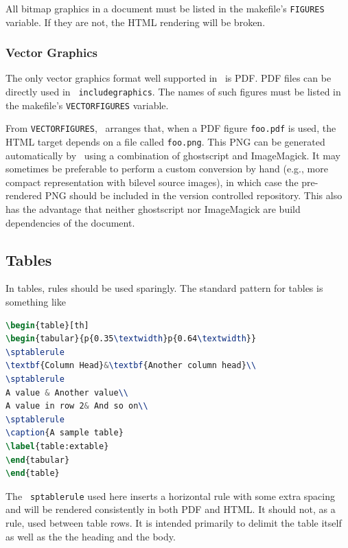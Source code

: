 \documentclass[11pt,a4paper]{ivoa}
\newcommand{\texword}[1]{\texttt{\color{texcolor} #1}}
\begin{document}
All bitmap graphics in a document must  be listed in the makefile's
\texttt{FIGURES} variable.  If they are not, the HTML rendering will be
broken.

\subsubsection{Vector Graphics}
\label{sect:vectorgraphics}

The only vector graphics format well supported in \ivoatex\ is PDF.  PDF
files can be directly used in \texword{includegraphics}.  The names of
such figures must be listed in the makefile's \texttt{VECTORFIGURES}
variable.

From \texttt{VECTORFIGURES}, \ivoatex\ arranges that, when a PDF figure 
\texttt{foo.pdf} is used, the HTML target depends on a file called
\texttt{foo.png}.  This PNG can be generated automatically by
\ivoatex\ using a combination of ghostscript and ImageMagick.  It may
sometimes be preferable to perform a custom conversion by hand (e.g.,
more compact representation with bilevel source images), in which case
the pre-rendered PNG should be included in the version controlled
repository.  This also
has the advantage that neither ghostscript nor ImageMagick are build
dependencies of the document.

\subsection{Tables}

In tables, rules should be used sparingly.  The standard pattern for tables is
something like
\begin{lstlisting}[language=tex]
\begin{table}[th]
\begin{tabular}{p{0.35\textwidth}p{0.64\textwidth}}
\sptablerule
\textbf{Column Head}&\textbf{Another column head}\\
\sptablerule
A value & Another value\\
A value in row 2& And so on\\
\sptablerule
\caption{A sample table}
\label{table:extable}
\end{tabular}
\end{table}
\end{lstlisting}

The \texword{sptablerule} used here inserts a horizontal rule with some
extra spacing and will be rendered consistently in both PDF and HTML.
It should not, as a rule, used between table rows. It is intended
primarily to delimit the table itself as well as the the heading and the
body.
\end{document}
